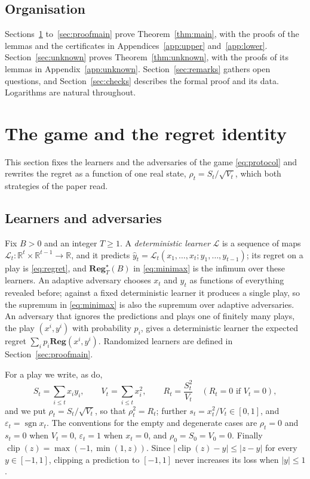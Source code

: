 \documentclass[12pt]{amsart}
\theoremstyle{definition}
\numberwithin{equation}{section}
\newcommand{\R}{\mathbb{R}}
\newcommand{\Reg}{\mathbf{Reg}}
\newcommand{\Regs}{\mathbf{Reg}^{\star}}
\newcommand{\clip}{\operatorname{clip}}
\newcommand{\sgn}{\operatorname{sgn}}
\newcommand{\yh}{\hat y}
\begin{document}
\subsection*{Organisation}
Sections~\ref{sec:setting} to~\ref{sec:proofmain} prove Theorem~\ref{thm:main}, with the proofs of the lemmas and the certificates in Appendices~\ref{app:upper} and~\ref{app:lower}. Section~\ref{sec:unknown} proves Theorem~\ref{thm:unknown}, with the proofs of its lemmas in Appendix~\ref{app:unknown}. Section~\ref{sec:remarks} gathers open questions, and Section~\ref{sec:checks} describes the formal proof and its data. Logarithms are natural throughout.

\section{The game and the regret identity}\label{sec:setting}

This section fixes the learners and the adversaries of the game \eqref{eq:protocol} and rewrites the regret as a function of one real state, $\rho_t=S_t/\sqrt{V_t}$, which both strategies of the paper read.

\subsection{Learners and adversaries}
Fix $B>0$ and an integer $T\ge1$. A \emph{deterministic learner} $\mathcal L$ is a sequence of maps $\mathcal L_t\colon\R^t\times\R^{t-1}\to\R$, and it predicts $\yh_t=\mathcal L_t(x_1,\dots,x_t;y_1,\dots,y_{t-1})$; its regret on a play is \eqref{eq:regret}, and $\Regs_T(B)$ in \eqref{eq:minimax} is the infimum over these learners. An adaptive adversary chooses $x_t$ and $y_t$ as functions of everything revealed before; against a fixed deterministic learner it produces a single play, so the supremum in \eqref{eq:minimax} is also the supremum over adaptive adversaries. An adversary that ignores the predictions and plays one of finitely many plays, the play $(x^i,y^i)$ with probability $p_i$, gives a deterministic learner the expected regret $\sum_ip_i\Reg(x^i,y^i)$. Randomized learners are defined in Section~\ref{sec:proofmain}.

For a play we write, as \citet[Section~2]{CQRZ} do,
\[
S_t=\sum_{i\le t}x_iy_i,\qquad V_t=\sum_{i\le t}x_i^2,\qquad R_t=\frac{S_t^2}{V_t}\quad(R_t=0\text{ if }V_t=0),
\]
and we put $\rho_t=S_t/\sqrt{V_t}$, so that $\rho_t^2=R_t$; further $s_t=x_t^2/V_t\in[0,1]$, and $\varepsilon_t=\sgn x_t$. The conventions for the empty and degenerate cases are $\rho_t=0$ and $s_t=0$ when $V_t=0$, $\varepsilon_t=1$ when $x_t=0$, and $\rho_0=S_0=V_0=0$. Finally $\clip(z)=\max(-1,\min(1,z))$. Since $|\clip(z)-y|\le|z-y|$ for every $y\in[-1,1]$, clipping a prediction to $[-1,1]$ never increases its loss when $|y|\le1$.
\end{document}

